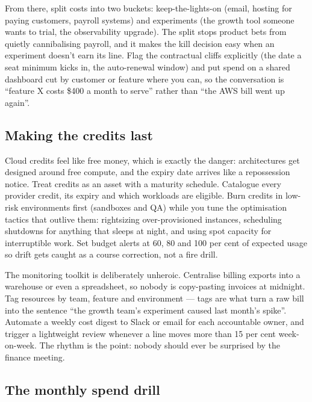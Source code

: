 From there, split costs into two buckets: keep-the-lights-on (email, hosting for paying customers, payroll systems) and experiments (the growth tool someone wants to trial, the observability upgrade). The split stops product bets from quietly cannibalising payroll, and it makes the kill decision easy when an experiment doesn't earn its line. Flag the contractual cliffs explicitly (the date a seat minimum kicks in, the auto-renewal window) and put spend on a shared dashboard cut by customer or feature where you can, so the conversation is ``feature X costs \$400 a month to serve'' rather than ``the AWS bill went up again''.



\subsection{Making the credits last}


Cloud credits feel like free money, which is exactly the danger: architectures get designed around free compute, and the expiry date arrives like a repossession notice. Treat credits as an asset with a maturity schedule. Catalogue every provider credit, its expiry and which workloads are eligible. Burn credits in low-risk environments first (sandboxes and QA) while you tune the optimisation tactics that outlive them: rightsizing over-provisioned instances, scheduling shutdowns for anything that sleeps at night, and using spot capacity for interruptible work. Set budget alerts at 60, 80 and 100 per cent of expected usage so drift gets caught as a course correction, not a fire drill.


The monitoring toolkit is deliberately unheroic. Centralise billing exports into a warehouse or even a spreadsheet, so nobody is copy-pasting invoices at midnight. Tag resources by team, feature and environment — tags are what turn a raw bill into the sentence ``the growth team's experiment caused last month's spike''. Automate a weekly cost digest to Slack or email for each accountable owner, and trigger a lightweight review whenever a line moves more than 15 per cent week-on-week. The rhythm is the point: nobody should ever be surprised by the finance meeting.



\subsection{The monthly spend drill}


